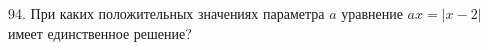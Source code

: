 94. При каких положительных значениях параметра $a$ уравнение $ax=|x-2|$ имеет единственное решение?\\
